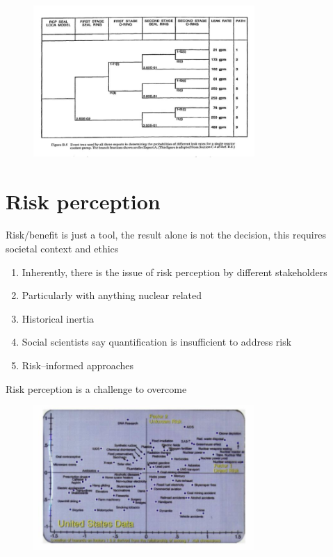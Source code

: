 \documentclass[aspectratio=1610,pdftex,dvipsnames,compress,xcolor={dvipsnames}]{beamer}
\begin{document}
\begin{frame}{}
    \begin{figure}
        \centering
        \includegraphics[width=0.75\textwidth]{event.tree.gpm.jpg}
    \end{figure}
\end{frame}


\section{Risk perception}


\addtocounter{framenumber}{-1}
\begin{frame}{Risk/benefit is just a tool, the result alone is not the decision, this requires societal context and ethics}
    \begin{enumerate}[series=outerlist,topsep=0pt,itemsep=21pt,leftmargin=*,label=(\arabic*)]
        \item[]Inherently, there is the issue of risk perception by different stakeholders
        \item[]Particularly with anything nuclear related
        \item[]Historical inertia
        \item[]Social scientists say quantification is insufficient to address risk
        \item[]Risk--informed approaches
    \end{enumerate}
\end{frame}


\begin{frame}{Risk perception is a challenge to overcome}
    \begin{figure}
        \centering
        \includegraphics[width=0.75\textwidth]{risk.perception.jpg}
    \end{figure}
\end{frame}
\end{document}
